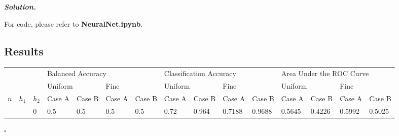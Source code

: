 \documentclass[10pt]{article}
\newenvironment{solution}[1][\it{Solution}]{\textbf{#1. } }{$\square$}
\begin{document}
\begin{solution}

For code, please refer to \textbf{NeuralNet.ipynb}.

\subsection*{Results}






\begin{table}[H]
\tiny
\begin{tabular}{|l|l|l|l|l|l|l|l|l|l|l|l|l|l|l|}
\hline
\rowcolor[HTML]{ECF4FF} 
\cellcolor[HTML]{ECF4FF}                        & \cellcolor[HTML]{ECF4FF}                     & \cellcolor[HTML]{ECF4FF}                     & \multicolumn{4}{l|}{\cellcolor[HTML]{ECF4FF}Balanced Accuracy}                                                                    & \multicolumn{4}{l|}{\cellcolor[HTML]{ECF4FF}Classification Accuracy}                                                              & \multicolumn{4}{l|}{\cellcolor[HTML]{ECF4FF}Area Under the ROC Curve}                                                             \\ \cline{4-15} 
\cellcolor[HTML]{ECF4FF}                        & \cellcolor[HTML]{ECF4FF}                     & \cellcolor[HTML]{ECF4FF}                     & \multicolumn{2}{l|}{\cellcolor[HTML]{F8FF00}Uniform}            & \multicolumn{2}{l|}{\cellcolor[HTML]{FFFFC7}Fine}               & \multicolumn{2}{l|}{\cellcolor[HTML]{F8FF00}Uniform}            & \multicolumn{2}{l|}{\cellcolor[HTML]{FFFFC7}Fine}               & \multicolumn{2}{l|}{\cellcolor[HTML]{F8FF00}Uniform}            & \multicolumn{2}{l|}{\cellcolor[HTML]{FFFFC7}Fine}               \\ \cline{4-15} 
\multirow{-3}{*}{\cellcolor[HTML]{ECF4FF}$n$}     & \multirow{-3}{*}{\cellcolor[HTML]{ECF4FF}$h_1$} & \multirow{-3}{*}{\cellcolor[HTML]{ECF4FF}$h_2$} & \cellcolor[HTML]{329A9D}Case A & \cellcolor[HTML]{96FFFB}Case B & \cellcolor[HTML]{329A9D}Case A & \cellcolor[HTML]{96FFFB}Case B & \cellcolor[HTML]{329A9D}Case A & \cellcolor[HTML]{96FFFB}Case B & \cellcolor[HTML]{329A9D}Case A & \cellcolor[HTML]{96FFFB}Case B & \cellcolor[HTML]{329A9D}Case A & \cellcolor[HTML]{96FFFB}Case B & \cellcolor[HTML]{329A9D}Case A & \cellcolor[HTML]{96FFFB}Case B \\ \hline
\rowcolor[HTML]{C0C0C0} 
\cellcolor[HTML]{9AFF99}                        & \cellcolor[HTML]{FE0000}                     & \cellcolor[HTML]{FFCE93}0                    & 0.5                            & 0.5                            & 0.5                            & 0.5                            & \cellcolor[HTML]{EFEFEF}0.72   & \cellcolor[HTML]{EFEFEF}0.964  & \cellcolor[HTML]{EFEFEF}0.7188 & \cellcolor[HTML]{EFEFEF}0.9688 & 0.5645                         & 0.4226                         & 0.5992                         & 0.5025                         \\ \cline{3-15} 

\end{tabular}
\end{table}
\end{solution}
\end{document}
